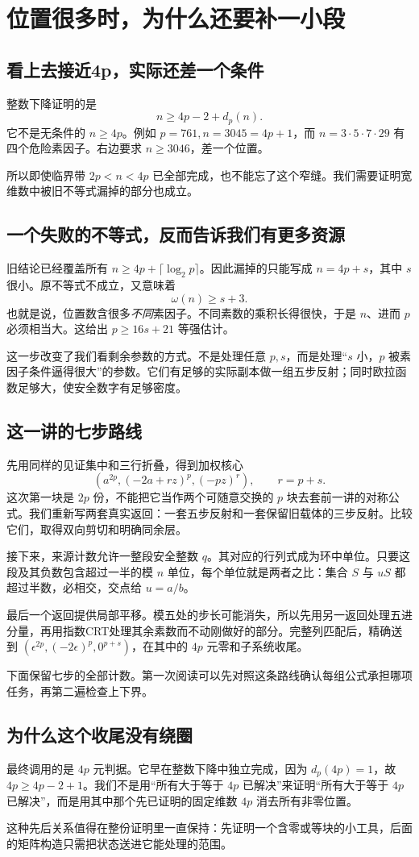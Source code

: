 \chapter{位置很多时，为什么还要补一小段}\label{sec:wide}
\section{看上去接近4p，实际还差一个条件}
整数下降证明的是
\[n\ge4p-2+d_p(n).
\]
它不是无条件的 $n\ge4p$。例如 $p=761,n=3045=4p+1$，而 $n=3\cdot5\cdot7\cdot29$ 有四个危险素因子。右边要求 $n\ge3046$，差一个位置。

所以即使临界带 $2p<n<4p$ 已全部完成，也不能忘了这个窄缝。我们需要证明宽维数中被旧不等式漏掉的部分也成立。

\section{一个失败的不等式，反而告诉我们有更多资源}
旧结论已经覆盖所有 $n\ge4p+\lceil\log_2p\rceil$。因此漏掉的只能写成 $n=4p+s$，其中 $s$ 很小。原不等式不成立，又意味着
\[\omega(n)\ge s+3.
\]
也就是说，位置数含很多\emph{不同}素因子。不同素数的乘积长得很快，于是 $n$、进而 $p$ 必须相当大。这给出 $p\ge16s+21$ 等强估计。

这一步改变了我们看剩余参数的方式。不是处理任意 $p,s$，而是处理“$s$ 小，$p$ 被素因子条件逼得很大”的参数。它们有足够的实际副本做一组五步反射；同时欧拉函数足够大，使安全数字有足够密度。

\section{这一讲的七步路线}
先用同样的见证集中和三行折叠，得到加权核心
\[(a^{2p},(-2a+rz)^p,(-pz)^r),\qquad r=p+s.
\]
这次第一块是 $2p$ 份，不能把它当作两个可随意交换的 $p$ 块去套前一讲的对称公式。我们重新写两套真实返回：一套五步反射和一套保留旧载体的三步反射。比较它们，取得双向剪切和明确同余层。

接下来，来源计数允许一整段安全整数 $q$。其对应的行列式成为环中单位。只要这段及其负数包含超过一半的模 $n$ 单位，每个单位就是两者之比：集合 $S$ 与 $uS$ 都超过半数，必相交，交点给 $u=a/b$。

最后一个返回提供局部平移。模五处的步长可能消失，所以先用另一返回处理五进分量，再用指数CRT处理其余素数而不动刚做好的部分。完整列匹配后，精确送到 $(\epsilon^{2p},(-2\epsilon)^p,0^{p+s})$，在其中的 $4p$ 元零和子系统收尾。

下面保留七步的全部计数。第一次阅读可以先对照这条路线确认每组公式承担哪项任务，再第二遍检查上下界。

\section{为什么这个收尾没有绕圈}
最终调用的是 $4p$ 元判据。它早在整数下降中独立完成，因为 $d_p(4p)=1$，故 $4p\ge4p-2+1$。我们不是用“所有大于等于 $4p$ 已解决”来证明“所有大于等于 $4p$ 已解决”，而是用其中那个先已证明的固定维数 $4p$ 消去所有非零位置。

这种先后关系值得在整份证明里一直保持：先证明一个含零或等块的小工具，后面的矩阵构造只需把状态送进它能处理的范围。
